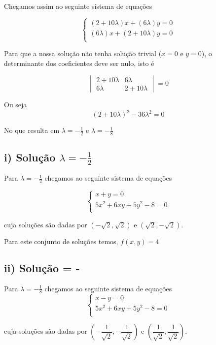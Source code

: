 \documentclass[
	article,			%
	11pt,				%
	oneside,			%
	a4paper,			%
	english,			%
	brazil,				%
	sumario=tradicional
	]{abntex2}
\begin{document}
	Chegamos assim ao seguinte sistema de equações

	$$\begin{cases} \left( 2+10\lambda \right) x+\left( 6\lambda \right) y=0\\ \left( 6\lambda \right) x+\left( 2+10\lambda \right) y=0 \\ \end{cases} $$

	Para que a nossa solução não tenha solução trivial ($x=0$ e $y=0$), o determinante dos coeficientes deve ser nulo, isto é

	$$
		\begin{vmatrix}
			2 + 10 \lambda & 6 \lambda \\
			6 \lambda & 2 + 10 \lambda
		\end{vmatrix}
		=
		0
	$$

	Ou seja
	$$(2+10 \lambda)^2 -36 \lambda^2 = 0$$

	No que resulta em $\lambda = -\frac{1}{2}$ e $\lambda = -\frac{1}{8}$


	\subsection*{i) Solução $\lambda = -\frac{1}{2}$}
	Para $\lambda = -\frac{1}{2}$ chegamos ao seguinte sistema de equações

	$$\begin{cases}  x + y = 0\\ 5x^2+6xy+5y^2-8=0\\ \end{cases} $$

	cuja soluções são dadas por $\left(-\sqrt{2}, \sqrt{2}\right)$ e $\left(\sqrt{2}, -\sqrt{2}\right)$.

	Para este conjunto de soluções temos, $f(x,y)=4$


	\subsection*{ii) Solução \lambda = -}


	Para $\lambda = -\frac{1}{8}$ chegamos ao seguinte sistema de equações
	$$\begin{cases}  x - y = 0\\ 5x^2+6xy+5y^2-8=0\\ \end{cases} $$

	cuja soluções são dadas por $\left(-\dfrac{1}{\sqrt{2}}, -\dfrac{1}{\sqrt{2}}\right)$ e $\left(\dfrac{1}{\sqrt{2}}, \dfrac{1}{\sqrt{2}}\right)$.
\end{document}
